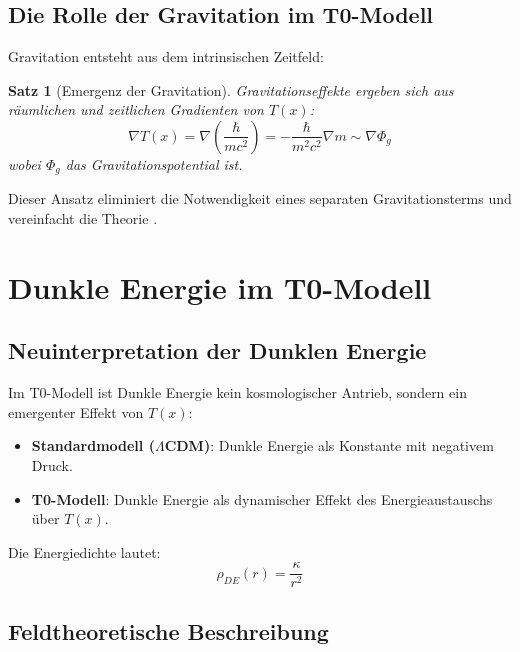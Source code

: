 \documentclass[a4paper,12pt]{article}
\newtheorem{theorem}{Satz}
\theoremstyle{definition}
\theoremstyle{remark}
\newcommand{\Tfield}{T(x)}
\begin{document}
	\subsection{Die Rolle der Gravitation im T0-Modell}
	
	Gravitation entsteht aus dem intrinsischen Zeitfeld:
	
	\begin{theorem}[Emergenz der Gravitation]
		Gravitationseffekte ergeben sich aus räumlichen und zeitlichen Gradienten von $\Tfield$:
		\begin{equation}
			\nabla \Tfield = \nabla \left(\frac{\hbar}{mc^2}\right) = -\frac{\hbar}{m^2c^2}\nabla m \sim \nabla \Phi_g
		\end{equation}
		wobei \(\Phi_g\) das Gravitationspotential ist.
	\end{theorem}
	
	Dieser Ansatz eliminiert die Notwendigkeit eines separaten Gravitationsterms und vereinfacht die Theorie \cite{pascher_galaxies_2025}.
	
	\section{Dunkle Energie im T0-Modell}
	
	\subsection{Neuinterpretation der Dunklen Energie}
	
	Im T0-Modell ist Dunkle Energie kein kosmologischer Antrieb, sondern ein emergenter Effekt von \(\Tfield\):
	
	\begin{itemize}
		\item \textbf{Standardmodell ($\Lambda$CDM)}: Dunkle Energie als Konstante mit negativem Druck.
		\item \textbf{T0-Modell}: Dunkle Energie als dynamischer Effekt des Energieaustauschs über $\Tfield$.
	\end{itemize}
	
	Die Energiedichte lautet:
	\begin{equation}
		\rho_{DE}(r) = \frac{\kappa}{r^2}
	\end{equation}
	
	\subsection{Feldtheoretische Beschreibung}
	
\end{document}
